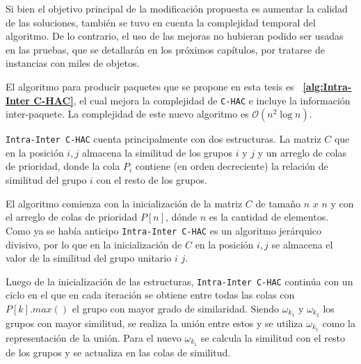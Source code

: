 Si bien el objetivo principal de la modificación propuesta es aumentar la calidad de las soluciones, también se tuvo en cuenta la complejidad temporal del algoritmo. De lo contrario, el uso de las mejoras no hubieran podido ser usadas en las pruebas, que se detallarán en los próximos capítulos, por tratarse de instancias con miles de objetos.

El algoritmo para producir paquetes que se propone en esta tesis es \textbf{~\autoref{alg:Intra-Inter C-HAC}}, el cual mejora la complejidad de  \texttt{C-HAC} e incluye la información inter-paquete. La complejidad de este nuevo algoritmo es $\mathcal{O}(n^{2}\log n)$. 

\texttt{Intra-Inter C-HAC} cuenta principalmente con dos estructuras. La matriz $C$ que en la posición $i,j$ almacena la similitud de los grupos $i$ y $j$ y un arreglo de colas de prioridad, donde la cola $P_i$ contiene (en orden decreciente) la relación de similitud del grupo $i$ con el resto de los grupos.

El algoritmo comienza con la inicialización de la matriz $C$ de tamaño $n$ $x$ $n$ y con el arreglo de colas de prioridad $P\left[n\right]$, dónde $n$ es la cantidad de elementos. Como ya se había anticipo \texttt{Intra-Inter C-HAC} es un algoritmo jerárquico divisivo, por lo que en la inicialización de $C$ en la posición $i,j$ se almacena el valor de la similitud del grupo unitario $i$ $j$.

Luego de la inicialización de las estructuras, \texttt{Intra-Inter C-HAC} continúa con un ciclo en el que en cada iteración se obtiene entre todas las colas con $P\left[k\right].max()$ el grupo con mayor grado de similaridad. Siendo $\omega_{k_{1}}$ y $\omega_{k_{2}}$ los grupos con mayor similitud, se realiza la unión entre estos y se utiliza $\omega_{k_{1}}$  como la representación de la unión. Para el nuevo  $\omega_{k_{1}}$ se calcula la similitud con el resto de los grupos y se actualiza en las colas de similitud.


